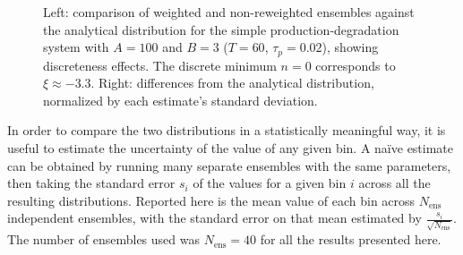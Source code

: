 \documentclass[english,letterpaper,12pt]{report}
\begin{document}
\begin{doublespacing}
\begin{figure}[t]
    \makebox[\linewidth][c]{
        \begin{subfigure}{3in}
            \begin{center}
                
            \end{center}
            \label{sfg:pdwe1-comp}
        \end{subfigure}
        \begin{subfigure}{3in}
            \begin{center}
                
            \end{center}
            \label{sfg:pdwe1-chi}
        \end{subfigure}
    }
    \caption{Left: comparison of weighted and non-reweighted ensembles against the analytical distribution for the simple production-degradation system with $A=100$ and $B=3$ ($T=60$, $\tau_p = 0.02$), showing discreteness effects. The discrete minimum $n=0$ corresponds to $\xi \approx -3.3$. Right: differences from the analytical distribution, normalized by each estimate's standard deviation.}
    \label{fig:pdwe1}
\end{figure}

In order to compare the two distributions in a statistically meaningful way, it is useful to estimate the uncertainty of the value of any given bin. A na\"{i}ve estimate can be obtained by running many separate ensembles with the same parameters, then taking the standard error $s_i$ of the values for a given bin $i$ across all the resulting distributions. Reported here is the mean value of each bin across $N_\text{ens}$ independent ensembles, with the standard error on that mean estimated by $\frac{s_i}{\sqrt{N_\text{ens}}}$. The number of ensembles used was $N_\text{ens} = 40$ for all the results presented here.


\end{doublespacing}
\end{document}
